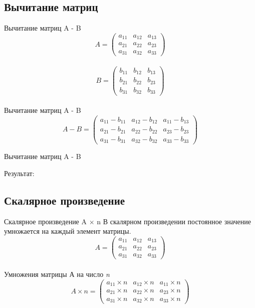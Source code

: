 \documentclass[12pt]{beamer}
\begin{document}
\subsection{Вычитание матриц}
\begin{frame}{Вычитание матриц A - B}
\[
  A = 
  \begin{pmatrix}
    a_{11} & a_{12} & a_{13}\\
    a_{21} & a_{22} & a_{23}\\
    a_{31} & a_{32} & a_{33}
  \end{pmatrix}
\]
\\
\[
  B = 
  \begin{pmatrix}
    b_{11} & b_{12} & b_{13}\\
    b_{21} & b_{22} & b_{23}\\
    b_{31} & b_{32} & b_{33}
  \end{pmatrix}
\]
\\
\vspace{0.5cm}
Вычитание матриц A - B
\\
\[
  A - B = 
  \begin{pmatrix}
    a_{11} - b_{11} & a_{12} - b_{12} & a_{11} - b_{13}\\
    a_{21} - b_{21} & a_{22} - b_{22} & a_{23} - b_{23}\\
    a_{31} - b_{31} & a_{32} - b_{32} & a_{33} - b_{33}
  \end{pmatrix}
\]
\end{frame}


\begin{frame}{Вычитание матриц A - B}

Результат: \\

\end{frame}


\subsection{Скалярное произведение}
\begin{frame}{Скалярное произведение A $\times$ n}
В скалярном произведении постоянное значение умножается на каждый элемент матрицы.\\
\[
  A = 
  \begin{pmatrix}
    a_{11} & a_{12} & a_{13}\\
    a_{21} & a_{22} & a_{23}\\
    a_{31} & a_{32} & a_{33}
  \end{pmatrix}
\]
\\
\vspace{0.5cm}
Умножения матрицы А на число \emph{n}
\\
\[
  A \times n = 
  \begin{pmatrix}
    a_{11} \times n & a_{12} \times n & a_{11} \times n \\
    a_{21} \times n & a_{22} \times n & a_{23} \times n \\
    a_{31} \times n & a_{32} \times n & a_{33} \times n
  \end{pmatrix}
\]
\end{frame}
\end{document}
